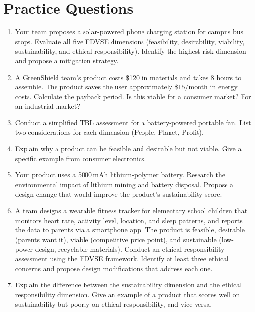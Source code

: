 \section{Practice Questions}
\begin{enumerate}[leftmargin=1.5em]
\item Your team proposes a solar-powered phone charging station for campus bus stops. Evaluate all five FDVSE dimensions (feasibility, desirability, viability, sustainability, and ethical responsibility). Identify the highest-risk dimension and propose a mitigation strategy.
\item A GreenShield team's product costs \$120 in materials and takes 8 hours to assemble. The product saves the user approximately \$15/month in energy costs. Calculate the payback period. Is this viable for a consumer market? For an industrial market?
\item Conduct a simplified TBL assessment for a battery-powered portable fan. List two considerations for each dimension (People, Planet, Profit).
\item Explain why a product can be feasible and desirable but not viable. Give a specific example from consumer electronics.
\item Your product uses a 5000\,mAh lithium-polymer battery. Research the environmental impact of lithium mining and battery disposal. Propose a design change that would improve the product's sustainability score.
\item A team designs a wearable fitness tracker for elementary school children that monitors heart rate, activity level, location, and sleep patterns, and reports the data to parents via a smartphone app. The product is feasible, desirable (parents want it), viable (competitive price point), and sustainable (low-power design, recyclable materials). Conduct an ethical responsibility assessment using the FDVSE framework. Identify at least three ethical concerns and propose design modifications that address each one.
\item Explain the difference between the sustainability dimension and the ethical responsibility dimension. Give an example of a product that scores well on sustainability but poorly on ethical responsibility, and vice versa.
\end{enumerate}

